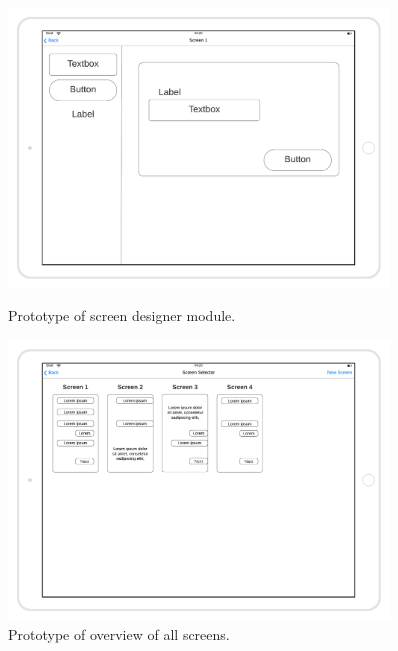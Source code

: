 \begin{figure}[H]
    \centering
    \begin{minipage}{0.45\textwidth}
        \centering
        \includegraphics[width=0.9\textwidth]{images/Design-a-screen-mockup.png}
        \caption{Prototype of screen designer module.}
    \end{minipage}\hfill
    \begin{minipage}{0.45\textwidth}
        \centering
        \includegraphics[width=0.9\textwidth]{images/screens-mockup.png}
        \caption{Prototype of overview of all screens.}
    \end{minipage}
\end{figure}

